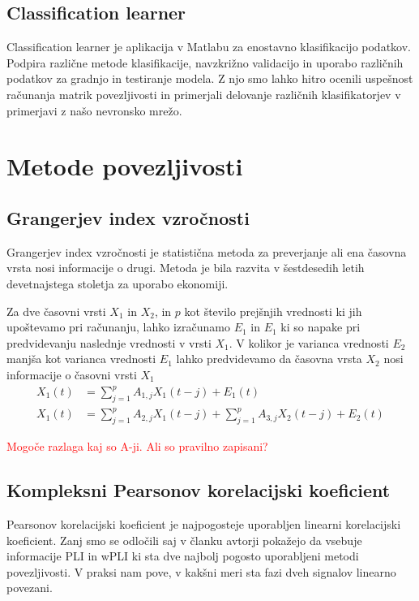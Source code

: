\subsection{Classification learner}
Classification learner je aplikacija v Matlabu za enostavno klasifikacijo podatkov. Podpira različne metode klasifikacije, navzkrižno validacijo in uporabo različnih podatkov za gradnjo in testiranje modela. Z njo smo lahko hitro ocenili uspešnost računanja matrik povezljivosti in primerjali delovanje različnih klasifikatorjev v primerjavi z našo nevronsko mrežo.

\section{Metode povezljivosti}
\subsection{Grangerjev index vzročnosti}
Grangerjev index vzročnosti je statistična metoda za preverjanje ali ena časovna vrsta nosi informacije o drugi. Metoda je bila razvita v šestdesedih letih devetnajstega stoletja za uporabo ekonomiji.

Za dve časovni vrsti $X_1$ in $X_2$, in $p$ kot število prejšnjih vrednosti ki jih upoštevamo pri računanju, lahko izračunamo $E_1$ in $E_1$ ki so napake pri predvidevanju naslednje vrednosti v vrsti $X_1$. V kolikor je varianca vrednosti $E_2$ manjša kot varianca vrednosti $E_1$ lahko predvidevamo da časovna vrsta $X_2$ nosi informacije o časovni vrsti $X_1$
\begin{align*}
X_1(t) &= \sum_{j=1}^{p} A_{1,j} X_1(t-j) + E_1(t)\\
X_1(t) &= \sum_{j=1}^{p} A_{2,j} X_1(t-j) + \sum_{j=1}^{p} A_{3,j} X_2(t-j) + E_2(t)
\end{align*}


\textcolor{red}{Mogoče razlaga kaj so A-ji. Ali so pravilno zapisani?}

\cite{seth_granger_2007}

\subsection{Kompleksni Pearsonov korelacijski koeficient}
Pearsonov korelacijski koeficient je najpogosteje uporabljen linearni korelacijski koeficient. Zanj smo se odločili saj v članku   avtorji pokažejo da vsebuje informacije PLI in wPLI ki sta dve najbolj pogosto uporabljeni metodi povezljivosti. V praksi nam pove, v kakšni meri sta fazi dveh signalov linearno povezani.

